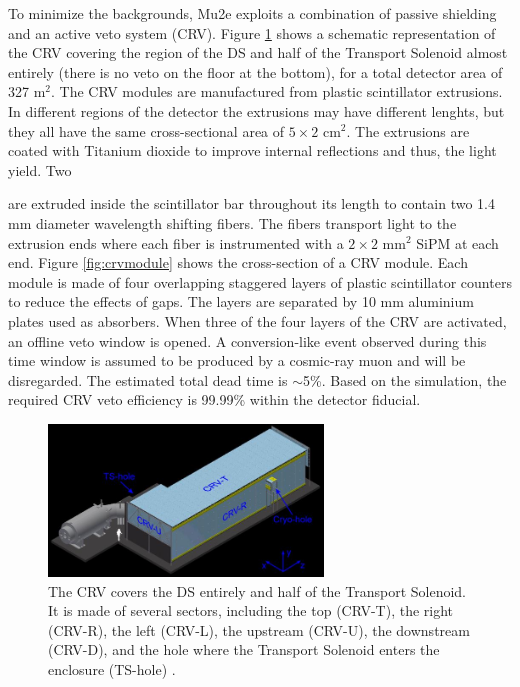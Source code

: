 To minimize the backgrounds, Mu2e exploits a combination of passive shielding and an active 
 veto system \add(CRV). Figure \ref{fig:crv} shows a 
schematic representation of 
the CRV covering the region of the DS and  half of the Transport Solenoid 
almost entirely (there is no veto on the floor at the bottom), for a total detector area
of 327 m$^2$.
The CRV modules are manufactured from plastic scintillator extrusions. 
In different regions of the detector the extrusions may have different lenghts, 
but they all have the same cross-sectional area of $5 \times 2$ cm$^2$.
The extrusions are coated with Titanium dioxide to improve internal reflections and thus, the light yield. 
Two 

are extruded inside the scintillator bar throughout its length to contain two 
1.4 mm diameter wavelength shifting fibers. The fibers transport light to the extrusion 
ends where each fiber is instrumented with a $2 \times 2$ mm$^2$ SiPM at each end. Figure \ref{fig:crvmodule} 
shows the cross-section of a CRV module. Each module is made of four overlapping staggered layers 
of plastic scintillator counters to reduce the effects of gaps. The 
layers are separated by 10 mm aluminium plates used as absorbers. 
When three of the four layers of the CRV are activated, an offline veto window is opened.
A conversion-like event observed during this time window is assumed to be produced by a cosmic-ray muon
and will be disregarded. 
The estimated total dead time is $\sim$5\%.
Based on the simulation, the required CRV veto efficiency is 99.99\% within the detector fiducial.

\begin{figure}[!h]
\centering
\includegraphics[width =0.65\textwidth]{figures/jpg/Crv_downstream.jpg}
\caption[The CRV features and components.]{The CRV covers the DS entirely and half 
of the Transport Solenoid. It is made of several sectors, including the top 
(CRV-T), the right (CRV-R), the left (CRV-L), the upstream (CRV-U), the downstream 
(CRV-D), and the hole where the Transport Solenoid enters the enclosure (TS-hole) \cite{bartoszek2015mu2e}.}
\label{fig:crv}
\end{figure}

